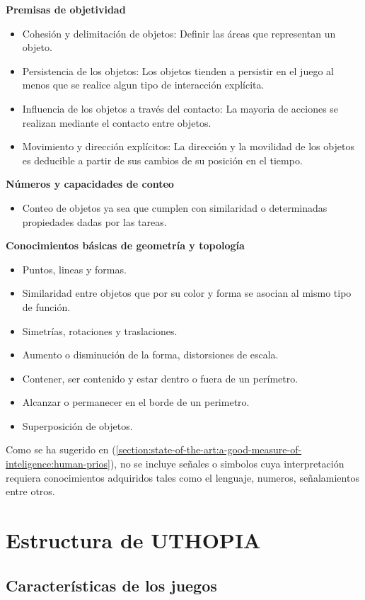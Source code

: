 \textbf{Premisas de objetividad}
\begin{itemize}
\item Cohesión y delimitación de objetos: Definir las áreas que representan un objeto.
\item Persistencia de los objetos: Los objetos tienden a persistir en el juego al menos que se realice algun tipo de interacción explícita.
\item Influencia de los objetos a través del contacto: La mayoria de acciones se realizan mediante el contacto entre objetos.
\item Movimiento y dirección explícitos: La dirección y la movilidad de los objetos es deducible a partir de sus cambios de su posición en el tiempo.
\end{itemize}

\textbf{Números y capacidades de conteo}
\begin{itemize}
    \item Conteo de objetos ya sea que cumplen con similaridad o determinadas propiedades dadas por las tareas.
\end{itemize}

\textbf{Conocimientos básicas de geometría y topología}
\begin{itemize}
\item Puntos, lineas y formas.
\item Similaridad entre objetos que por su color y forma se asocian al mismo tipo de función.
\item Simetrías, rotaciones y traslaciones.
\item Aumento o disminución de la forma, distorsiones de escala.
\item Contener, ser contenido y estar dentro o fuera de un perímetro.
\item Alcanzar o permanecer en el borde de un perimetro.
\item Superposición de objetos.
\end{itemize}

Como se ha sugerido en (\ref{section:state-of-the-art:a-good-measure-of-inteligence:human-prios}), no se incluye señales o simbolos cuya interpretación requiera conocimientos adquiridos tales como el lenguaje, numeros, señalamientos entre otros. 

\section{Estructura de UTHOPIA}

\subsection{Características de los juegos}

